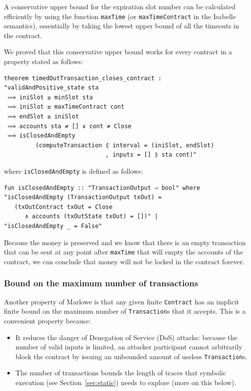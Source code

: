 \documentclass[runningheads]{llncs}
\begin{document}
A conservative upper bound for the expiration slot number can be calculated efficiently by using the function \texttt{maxTime} (or \texttt{maxTimeContract} in the Isabelle semantics), essentially by taking the lowest upper bound of all the timeouts in the contract.

We proved that this conservative upper bound works for every contract in a property stated as follows:

\begin{verbatim}
theorem timedOutTransaction_closes_contract :
"validAndPositive_state sta
 ⟹ iniSlot ≥ minSlot sta
 ⟹ iniSlot ≥ maxTimeContract cont
 ⟹ endSlot ≥ iniSlot
 ⟹ accounts sta ≠ [] ∨ cont ≠ Close
 ⟹ isClosedAndEmpty
         (computeTransaction ⦇ interval = (iniSlot, endSlot)
                             , inputs = [] ⦈ sta cont)"
\end{verbatim}

\noindent
where \texttt{isClosedAndEmpty} is defined as follows:

\begin{verbatim}
fun isClosedAndEmpty :: "TransactionOutput ⇒ bool" where
"isClosedAndEmpty (TransactionOutput txOut) =
   (txOutContract txOut = Close
      ∧ accounts (txOutState txOut) = [])" |
"isClosedAndEmpty _ = False"
\end{verbatim}
\noindent
Because the money is preserved and we know that there is an empty transaction that can be sent at any point after \texttt{maxTime} that will empty the accounts of the contract, we can conclude that money will not be locked in the contract forever.

\subsubsection{Bound on the maximum number of transactions\label{subsubsec:bound_max_transaction_number}}

Another property of Marlowe is that any given finite \texttt{Contract} has an implicit finite bound on the maximum number of \texttt{Transaction}s that it accepts. This is a convenient property because:

\begin{itemize}%
    \item It reduces the danger of Denegation of Service (DoS) attacks: because the number of valid inputs is limited, an attacker participant cannot arbitrarily block the contract by issuing an unbounded amount of useless \texttt{Transaction}s.
    \item The number of transactions bounds the length of traces that symbolic execution (see Section~\ref{sec:static}) needs to explore (more on this below).%
\end{itemize}
\end{document}
